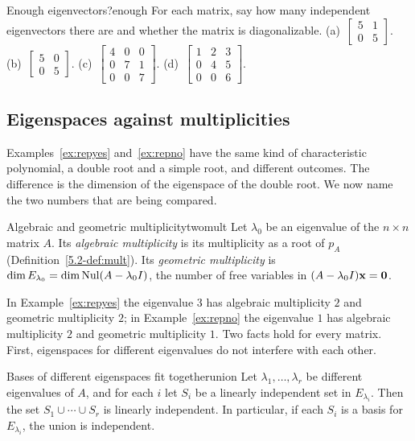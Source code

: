 \documentclass[11pt]{article}
\begin{document}
\begin{kc}{Enough eigenvectors?}{enough}
For each matrix, say how many independent eigenvectors there are and whether the matrix is diagonalizable. (a)~$\begin{bmatrix}5&1\\0&5\end{bmatrix}$. (b)~$\begin{bmatrix}5&0\\0&5\end{bmatrix}$. (c)~$\begin{bmatrix}4&0&0\\0&7&1\\0&0&7\end{bmatrix}$. (d)~$\begin{bmatrix}1&2&3\\0&4&5\\0&0&6\end{bmatrix}$.
\end{kc}

\subsection*{Eigenspaces against multiplicities}

Examples~\ref{ex:repyes} and~\ref{ex:repno} have the same kind of characteristic polynomial, a double root and a simple root, and different outcomes. The difference is the dimension of the eigenspace of the double root. We now name the two numbers that are being compared.

\begin{defn}{Algebraic and geometric multiplicity}{twomult}
Let $\lambda_0$ be an eigenvalue of the $n\times n$ matrix $A$. Its \emph{algebraic multiplicity} is its multiplicity as a root of $p_A$ (Definition~\ref{5.2-def:mult}). Its \emph{geometric multiplicity} is $\dim E_{\lambda_0}=\dim\operatorname{Nul}(A-\lambda_0I)$, the number of free variables in $(A-\lambda_0I)\mathbf{x}=\mathbf{0}$.
\end{defn}

In Example~\ref{ex:repyes} the eigenvalue $3$ has algebraic multiplicity $2$ and geometric multiplicity $2$; in Example~\ref{ex:repno} the eigenvalue $1$ has algebraic multiplicity $2$ and geometric multiplicity $1$. Two facts hold for every matrix. First, eigenspaces for different eigenvalues do not interfere with each other.

\begin{thm}{Bases of different eigenspaces fit together}{union}
Let $\lambda_1,\dots,\lambda_r$ be different eigenvalues of $A$, and for each $i$ let $S_i$ be a linearly independent set in $E_{\lambda_i}$. Then the set $S_1\cup\cdots\cup S_r$ is linearly independent. In particular, if each $S_i$ is a basis for $E_{\lambda_i}$, the union is independent.
\end{thm}
\end{document}
